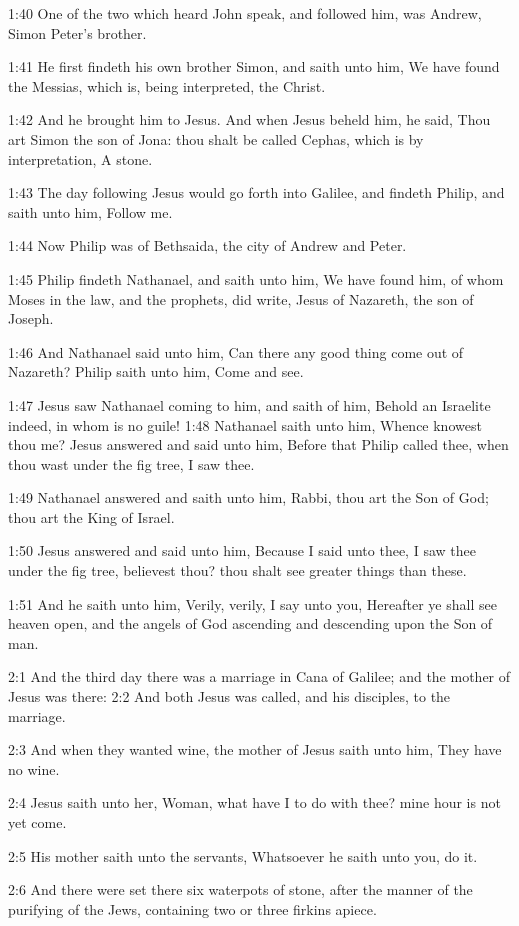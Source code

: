 1:40 One of the two which heard John speak, and followed him, was
Andrew, Simon Peter's brother.

1:41 He first findeth his own brother Simon, and saith unto him, We
have found the Messias, which is, being interpreted, the Christ.

1:42 And he brought him to Jesus. And when Jesus beheld him, he said,
Thou art Simon the son of Jona: thou shalt be called Cephas, which is
by interpretation, A stone.

1:43 The day following Jesus would go forth into Galilee, and findeth
Philip, and saith unto him, Follow me.

1:44 Now Philip was of Bethsaida, the city of Andrew and Peter.

1:45 Philip findeth Nathanael, and saith unto him, We have found him,
of whom Moses in the law, and the prophets, did write, Jesus of
Nazareth, the son of Joseph.

1:46 And Nathanael said unto him, Can there any good thing come out of
Nazareth? Philip saith unto him, Come and see.

1:47 Jesus saw Nathanael coming to him, and saith of him, Behold an
Israelite indeed, in whom is no guile!  1:48 Nathanael saith unto him,
Whence knowest thou me? Jesus answered and said unto him, Before that
Philip called thee, when thou wast under the fig tree, I saw thee.

1:49 Nathanael answered and saith unto him, Rabbi, thou art the Son of
God; thou art the King of Israel.

1:50 Jesus answered and said unto him, Because I said unto thee, I saw
thee under the fig tree, believest thou? thou shalt see greater things
than these.

1:51 And he saith unto him, Verily, verily, I say unto you, Hereafter
ye shall see heaven open, and the angels of God ascending and
descending upon the Son of man.

2:1 And the third day there was a marriage in Cana of Galilee; and the
mother of Jesus was there: 2:2 And both Jesus was called, and his
disciples, to the marriage.

2:3 And when they wanted wine, the mother of Jesus saith unto him,
They have no wine.

2:4 Jesus saith unto her, Woman, what have I to do with thee? mine
hour is not yet come.

2:5 His mother saith unto the servants, Whatsoever he saith unto you,
do it.

2:6 And there were set there six waterpots of stone, after the manner
of the purifying of the Jews, containing two or three firkins apiece.

